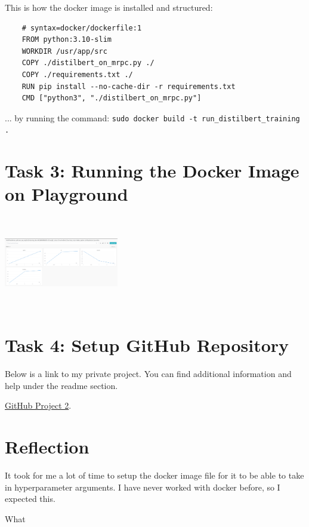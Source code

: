 \documentclass{article}
\begin{document}
This is how the docker image is installed and structured:

\begin{lstlisting}
    # syntax=docker/dockerfile:1
    FROM python:3.10-slim
    WORKDIR /usr/app/src
    COPY ./distilbert_on_mrpc.py ./ 
    COPY ./requirements.txt ./ 
    RUN pip install --no-cache-dir -r requirements.txt
    CMD ["python3", "./distilbert_on_mrpc.py"]
    \end{lstlisting}
... by running the command: 
\verb!sudo docker build -t run_distilbert_training .!

\section{Task 3: Running the Docker Image on Playground}
\includegraphics[width=5cm, height=4cm]{local}

\section{Task 4: Setup GitHub Repository}
Below is a link to my private project. You can find additional information and help under the readme section.


\href{https://github.com/JDCarona/project2-mlops}{GitHub Project 2}.




\section{Reflection}
It took for me a lot of time to setup the docker image file for it to be able to take in hyperparameter arguments.
I have never worked with docker before, so I expected this. 

What 
\end{document}
